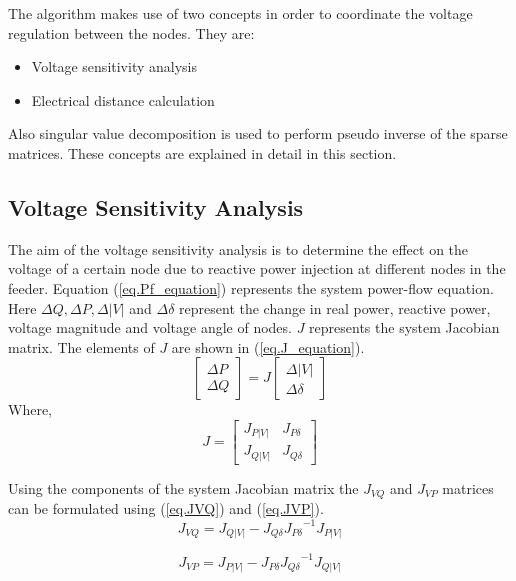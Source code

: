 The algorithm makes use of two concepts in order to coordinate the voltage regulation between the nodes. They are:
\begin{itemize}
\item Voltage sensitivity analysis
\item Electrical distance calculation
\end{itemize}
Also singular value decomposition is used to perform pseudo inverse of the sparse matrices. These concepts are explained in detail in this section.
\subsection{Voltage Sensitivity Analysis} \label{vsa}
The aim of the voltage sensitivity analysis is to determine the effect on the voltage of a certain node due to reactive power injection at different nodes in the feeder. Equation (\ref{eq.Pf_equation}) represents the system power-flow equation.  Here ${\Delta Q}, {\Delta P}, {\Delta |V|}$ and ${\Delta \delta}$ represent the change in real power, reactive power, voltage magnitude and voltage angle of nodes. $J$ represents the system Jacobian matrix. The elements of $J$ are shown in (\ref{eq.J_equation}).
\begin{equation}\label{eq.Pf_equation}
\begin{bmatrix}
{\Delta P}\\ {\Delta Q}
\end{bmatrix} =J\begin{bmatrix}
{\Delta|V|} \\ {\Delta\delta}
\end{bmatrix}
\end{equation}  
Where,
\begin{equation}\label{eq.J_equation}
    J = \begin{bmatrix}
{J_{P|V|}} & {J_{P\delta}}\\ {J_{Q|V|}} & {J_{Q\delta}}
\end{bmatrix}
\end{equation}

Using the components of the system Jacobian matrix the $J_{VQ}$ and $J_{VP}$ matrices can be formulated using (\ref{eq.JVQ}) and (\ref{eq.JVP}).
\begin{equation}\label{eq.JVQ}
    {J_{VQ}} = {J_{Q|V|}}-{J_{Q\delta}}{J_{P\delta}}^{-1}{J_{P|V|}}
\end{equation}

\begin{equation}\label{eq.JVP}
    {J_{VP}}={J_{P|V|}}-{J_{P\delta}}{J_{Q\delta}}^{-1}{J_{Q|V|}}
\end{equation}


